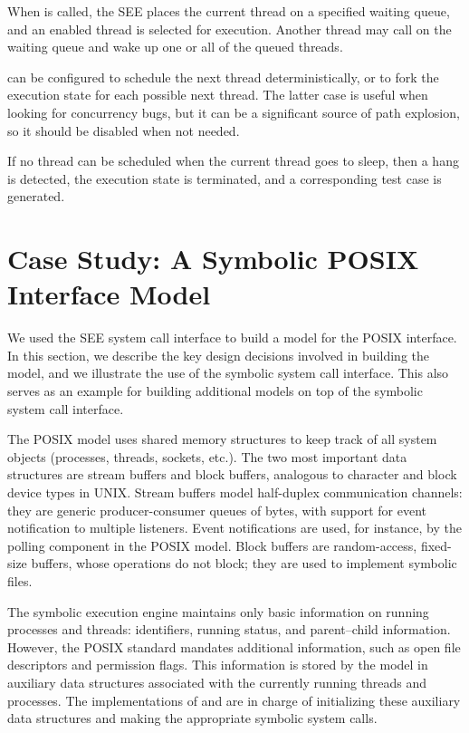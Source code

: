 When  is called, the SEE places the current thread on a specified waiting queue, and an enabled thread is selected for execution.
%
Another thread may call  on the waiting queue and wake up one or all of the queued threads.

\cnine can be configured to schedule the next thread deterministically, or to fork the execution state for each possible next thread.
%
The latter case is useful when looking for concurrency bugs, but it can be a significant source of path explosion, so it should be disabled when not needed.

If no thread can be scheduled when the current thread goes to sleep, then a hang is detected, the execution state is terminated,  and a corresponding test case is generated.




\section{Case Study: A Symbolic POSIX Interface Model}
\label{sec:cloud9:posix}

We used the SEE system call interface to build a model for the POSIX interface.
%
In this section, we describe the key design decisions involved in building the model, and we illustrate the use of the symbolic system call interface.
%
This also serves as an example for building additional models on top of the \cnine symbolic system call interface.

The POSIX model uses shared memory structures to keep track of all system objects (processes, threads, sockets, etc.).
%
The two most important data structures are stream buffers and block buffers, analogous to character and block device types in UNIX.  Stream buffers model half-duplex communication channels: they are generic producer-consumer queues of bytes, with support for event notification to multiple listeners.  Event notifications are used, for instance, by the polling component in the POSIX model.  Block buffers are random-access, fixed-size buffers, whose operations do not block; they are used to implement symbolic files.

The symbolic execution engine maintains only basic information on running processes and threads: identifiers, running status, and parent--child information.
%
However, the POSIX standard mandates additional information, such as open file descriptors and permission flags. This information is stored by the model in auxiliary data structures associated with the currently running threads and processes. The implementations of  and  are in charge of initializing these auxiliary data structures and making the appropriate symbolic system calls.

